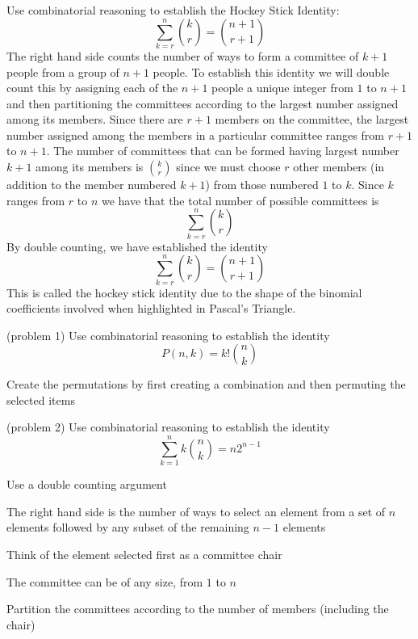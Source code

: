 \documentclass[handout]{ximera}
\begin{document}
\begin{example}[example 5]
Use combinatorial reasoning to establish the Hockey Stick Identity:
\[
\sum_{k=r}^{n}\binom{k}{r}=\binom{n+1}{r+1} %
\]
The right hand side counts the number of ways to form a committee of $k+1$ people from a group of $n+1$ people.
To establish this identity we will double count this by assigning each of the $n+1$ people a unique 
integer from $1$ to $n+1$ and then partitioning the committees according to the largest number 
assigned among its members.
Since there are $r+1$ members on the committee, the largest number assigned among the 
members in a particular committee ranges from $r+1$ to $n+1$.
The number of committees that can be formed having largest number $k+1$ among its members
is $\binom{k}{r}$ since we must choose
$r$ other members (in addition to the member numbered $k+1$) from those numbered $1$ to $k$. 
Since $k$ ranges 
from $r$ to $n$ we have that the total number of possible committees is
\[
\sum_{k=r}^{n}\binom{k}{r}
\]
By double counting, we have established the identity
\[
\sum_{k=r}^{n}\binom{k}{r}=\binom{n+1}{r+1}
\]
This is called the hockey stick identity due to the shape of the binomial 
coefficients involved when highlighted in Pascal's Triangle.
\end{example}


\begin{problem}(problem 1)
Use combinatorial reasoning to establish the identity
\[
P(n,k) = k!\binom{n}{k}
\]
\begin{hint}
Create the permutations by first creating a combination and then permuting the selected items
\end{hint}
\end{problem}



\begin{problem}(problem 2)
Use combinatorial reasoning to establish the identity
\[
\sum_{k=1}^n k\binom{n}{k} = n2^{n-1}
\]
\begin{hint}
Use a double counting argument
\end{hint}
\begin{hint}
The right hand side is the number of ways to select an element from a set of $n$ elements 
followed by any subset of the remaining $n-1$ elements
\end{hint}
\begin{hint}
Think of the element selected first as a committee chair
\end{hint}
\begin{hint}
The committee can be of any size, from $1$ to $n$
\end{hint}
\begin{hint}
Partition the committees according to the number of members (including the chair)
\end{hint}
\end{problem}
\end{document}

